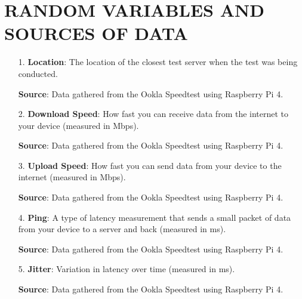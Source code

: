 \documentclass[conference]{IEEEtran}
\begin{document}
\section{RANDOM VARIABLES AND SOURCES OF DATA}
\begin{enumerate}
    \item[1.]
    \textbf{Location}:
    The location of the closest test server when the test was being conducted.

    \textbf{Source}: Data gathered from the Ookla Speedtest using Raspberry Pi 4. 
    \item[2.]    
    \textbf{Download Speed}: 
    How fast you can receive data from the internet to your device (measured in Mbps).

    \textbf{Source}: Data gathered from the Ookla Speedtest using Raspberry Pi 4. 
    \item[3.]
    \textbf{Upload Speed}:
    How fast you can send data from your device to the internet (measured in Mbps). 
    
    \textbf{Source}: Data gathered from the Ookla Speedtest using Raspberry Pi 4. 
    \item[4.]
    \textbf{Ping}: 
    A type of latency measurement that sends a small packet of data from your device to a server and back (measured in ms).

    \textbf{Source}: Data gathered from the Ookla Speedtest using Raspberry Pi 4. 
    \item[5.] 
    \textbf{Jitter}: 
    Variation in latency over time (measured in ms).

    \textbf{Source}: Data gathered from the Ookla Speedtest using Raspberry Pi 4. 
\end{enumerate}
\end{document}
